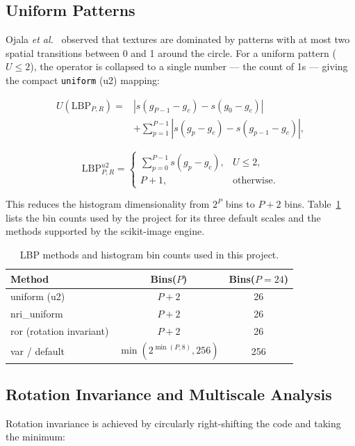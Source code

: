 \documentclass[conference]{IEEEtran}
\begin{document}
\subsection{Uniform Patterns}
Ojala \emph{et al.}~\cite{ojala2002multiresolution} observed that textures
are dominated by patterns with at most two spatial transitions between 0
and 1 around the circle. For a uniform pattern ($U\le 2$), the operator is
collapsed to a single number --- the count of 1s --- giving the compact
\textcolor{black}{\texttt{uniform}} (u2) mapping:

\begin{equation}
\begin{aligned}
U\!\left(\mathrm{LBP}_{P,R}\right)={}&
\left|s(g_{P-1}-g_c)-s(g_0-g_c)\right|\\
&+\sum_{p=1}^{P-1}\left|s(g_p-g_c)-s(g_{p-1}-g_c)\right|,
\end{aligned}
\label{eq:transitions}
\end{equation}

\begin{equation}
\mathrm{LBP}_{P,R}^{u2}=
\begin{cases}
\displaystyle\sum_{p=0}^{P-1} s(g_p-g_c), & U\le 2,\\[2mm]
P+1, & \text{otherwise}.
\end{cases}
\label{eq:uniform}
\end{equation}

This reduces the histogram dimensionality from $2^P$ bins to $P+2$ bins.
Table~\ref{tab:bins} lists the bin counts used by the project for its three
default scales and the methods supported by the scikit-image engine.

\begin{table}[!t]
\renewcommand{\arraystretch}{1.18}
\caption{LBP methods and histogram bin counts used in this project.}
\label{tab:bins}
\centering
\begin{tabular}{@{}lcc@{}}
\hline
\bfseries Method & \bfseries Bins($P$) & \bfseries Bins($P{=}24$)\\
\hline
uniform (u2) & $P+2$ & 26\\
nri\_uniform  & $P+2$ & 26\\
ror (rotation invariant) & $P+2$ & 26\\
var / default & $\min(2^{\min(P,8)},256)$ & 256\\
\hline
\end{tabular}
\end{table}

\subsection{Rotation Invariance and Multiscale Analysis}
Rotation invariance is achieved by circularly right-shifting the code and
taking the minimum:
\end{document}
